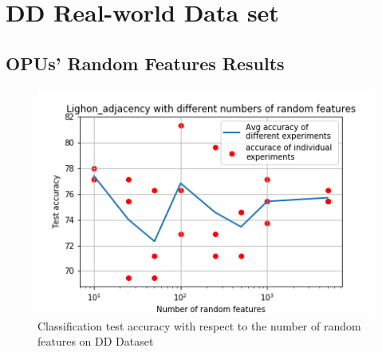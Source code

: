 \section{DD Real-world Data set}
\subsection{OPUs’ Random Features Results}
\begin{figure}[H]
\centering
\includegraphics[scale=0.7]{LatexDiss/Dissertation/figs/LightOn_adj_DD_varying_RF.png}

\caption[Classification test accuracy as a function of the number of random features]{Classification test accuracy with respect to the number of random features on DD Dataset}
\label{fig:LightON_DD_multfactor_RW}
\end{figure}
